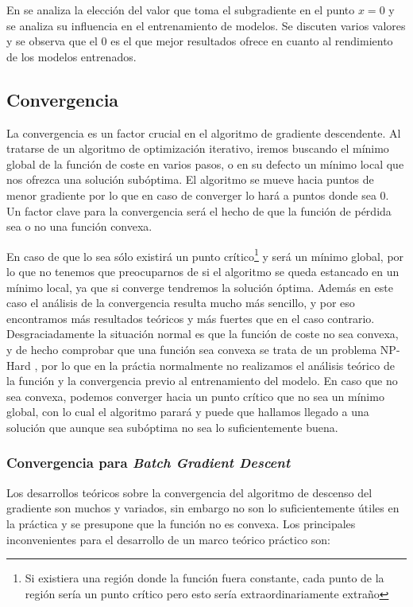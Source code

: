 En \cite{ReLuat0} se analiza la elección del valor que toma el subgradiente en el punto $x=0$ y se analiza su influencia en el entrenamiento de modelos. Se discuten varios valores y se observa que el 0 es el que mejor resultados ofrece en cuanto al rendimiento de los modelos entrenados.




\subsection{Convergencia} \label{sec:convergencia}

La convergencia es un factor crucial en el algoritmo de gradiente descendente. Al tratarse de un algoritmo de optimización iterativo, iremos buscando el mínimo global de la función de coste en varios pasos, o en su defecto un mínimo local que nos ofrezca una solución subóptima. El algoritmo se mueve hacia puntos de menor gradiente por lo que en caso de converger lo hará a puntos donde sea 0. Un factor clave para la convergencia será el hecho de que la función de pérdida sea o no una función convexa.

En caso de que lo sea sólo existirá un punto crítico\footnote{Si existiera una región donde la función fuera constante, cada punto de la región sería un punto crítico pero esto sería extraordinariamente extraño} y será un mínimo global, por lo que no tenemos que preocuparnos de si el algoritmo se queda estancado en un mínimo local, ya que si converge tendremos la solución óptima. Además en este caso el análisis de la convergencia resulta mucho más sencillo, y por eso encontramos más resultados teóricos y más fuertes que en el caso contrario. Desgraciadamente la situación normal es que la función de coste no sea convexa, y de hecho comprobar que una función sea convexa se trata de un problema NP-Hard \cite{Ahmadi_2011_NP_Convex}, por lo que en la práctia normalmente no realizamos el análisis teórico de la función y la convergencia previo al entrenamiento del modelo. En caso que no sea convexa, podemos converger hacia un punto crítico que no sea un mínimo global, con lo cual el algoritmo parará y puede que hallamos llegado a una solución que aunque sea subóptima no sea lo suficientemente buena.


\subsubsection{Convergencia para \textit{Batch Gradient Descent}}

Los desarrollos teóricos sobre la convergencia del algoritmo de descenso del gradiente son muchos y variados, sin embargo no son lo suficientemente útiles en la práctica y se presupone que la función no es convexa. Los principales inconvenientes para el desarrollo de un marco teórico práctico son:

